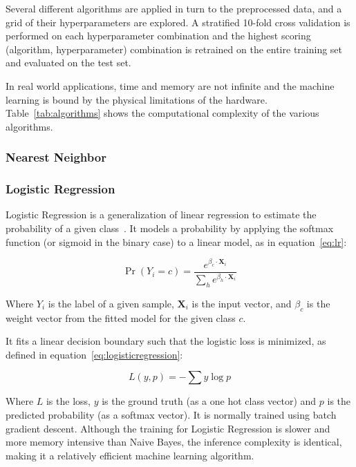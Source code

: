 \documentclass[landscape,twocolumn]{article}
\begin{document}
Several different algorithms are applied in turn to the preprocessed data, and a grid of their hyperparameters are explored. A stratified 10-fold cross validation is performed on each hyperparameter combination and the highest scoring (algorithm, hyperparameter) combination is retrained on the entire training set and evaluated on the test set.

In real world applications, time and memory are not infinite and the machine learning is bound by the physical limitations of the hardware. Table~\ref{tab:algorithms} shows the computational complexity of the various algorithms.

\subsubsection{Nearest Neighbor}


\subsubsection{Logistic Regression}
Logistic Regression is a generalization of linear regression to estimate the probability of a given class~\cite{wright1995logistic}. It models a probability by applying the softmax function (or sigmoid in the binary case) to a linear model, as in equation~\ref{eq:lr}:

\begin{equation}
	\label{eq:lr}
	\Pr\left(Y_i=c\right)=\frac{e^{\beta_c \cdot \textbf{X}_i}}{\sum_h{e^{\beta_h \cdot \textbf{X}_i}}}
\end{equation}

Where $Y_i$ is the label of a given sample, $\textbf{X}_i$ is the input vector, and $\beta_c$ is the weight vector from the fitted model for the given class $c$.

It fits a linear decision boundary such that the logistic loss is minimized, as defined in equation~\ref{eq:logisticregression}:

\begin{equation}
	\label{eq:logisticregression}
	L\left(y,p\right)=-\sum{y\log{p}}
\end{equation}

Where $L$ is the loss, $y$ is the ground truth (as a one hot class vector) and $p$ is the predicted probability (as a softmax vector). It is normally trained using batch gradient descent. Although the training for Logistic Regression is slower and more memory intensive than Naive Bayes, the inference complexity is identical, making it a relatively efficient machine learning algorithm.
\end{document}
